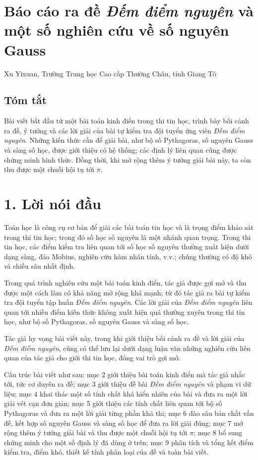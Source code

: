\documentclass[11pt]{article}
\begin{document}
\clearpage
\section*{Báo cáo ra đề \emph{Đếm điểm nguyên} và một số nghiên cứu về số
nguyên Gauss}

\begin{center}
Xu Yixuan, Trường Trung học Cao cấp Thường Châu, tỉnh Giang Tô
\end{center}

\subsection*{Tóm tắt}

Bài viết bắt đầu từ một bài toán kinh điển trong thi tin học, trình bày bối
cảnh ra đề, ý tưởng và các lời giải của bài tự kiểm tra đội tuyển ứng viên
\emph{Đếm điểm nguyên}. Những kiến thức cần để giải bài, như bộ số Pythagoras,
số nguyên Gauss và sàng số học, được giới thiệu có hệ thống; các định lý liên
quan cũng được chứng minh hình thức. Đồng thời, khi mở rộng thêm ý tưởng giải
bài này, ta còn thu được một chuỗi hội tụ tới \(\pi\).

\section*{1. Lời nói đầu}

Toán học là công cụ cơ bản để giải các bài toán tin học và là trọng điểm khảo
sát trong thi tin học; trong đó số học số nguyên là một nhánh quan trọng. Trong
thi tin học, các điểm kiểm tra liên quan tới số học số nguyên thường xuất hiện
dưới dạng sàng, đảo Mobius, nghiên cứu hàm nhân tính, v.v.; chúng thường có
độ khó và chiều sâu nhất định.

Trong quá trình nghiên cứu một bài toán kinh điển, tác giả được gợi mở và thu
được một cách làm có khả năng mở rộng khá mạnh; từ đó tác giả ra bài tự kiểm
tra đội tuyển tập huấn \emph{Đếm điểm nguyên}. Các lời giải của \emph{Đếm
điểm nguyên} liên quan tới nhiều điểm kiến thức không xuất hiện quá thường
xuyên trong thi tin học, như bộ số Pythagoras, số nguyên Gauss và sàng số học.

Tác giả hy vọng bài viết này, trong khi giới thiệu bối cảnh ra đề và lời giải
của \emph{Đếm điểm nguyên}, cũng có thể lưu lại dưới dạng luận văn những nghiên
cứu liên quan của tác giả cho giới thi tin học, đóng vai trò gợi mở.

Cấu trúc bài viết như sau: mục 2 giới thiệu bài toán kinh điển mà tác giả nhắc
tới, tức cơ duyên ra đề; mục 3 giới thiệu đề bài \emph{Đếm điểm nguyên} và
phạm vi dữ liệu; mục 4 khai thác một số tính chất khá hiển nhiên của bài và
đưa ra một lời giải vét cạn đơn giản; mục 5 giới thiệu các tính chất liên quan
tới bộ số Pythagoras và đưa ra một lời giải từng phần khả thi; mục 6 đào sâu
bản chất vấn đề, kết hợp số nguyên Gauss và sàng số học để đưa ra lời giải
đúng; mục 7 mở rộng thêm ý tưởng giải bài và thu được một chuỗi hội tụ tới
\(\pi\); mục 8 bổ sung chứng minh cho một số định lý đã dùng ở trên; mục 9
phân tích và tổng kết điểm kiểm tra, điểm khó, thiết kế tính phân loại của đề
và toàn bài viết.
\end{document}
